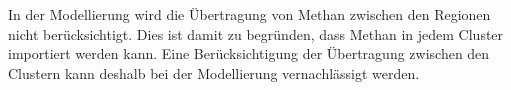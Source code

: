 In der Modellierung wird die Übertragung von Methan zwischen den Regionen nicht berück\-sichtigt. Dies ist damit zu begründen, dass Methan in jedem Cluster importiert werden kann. Eine Berücksichtigung der Übertragung zwischen den Clustern kann deshalb bei der Modellierung vernachlässigt werden.

